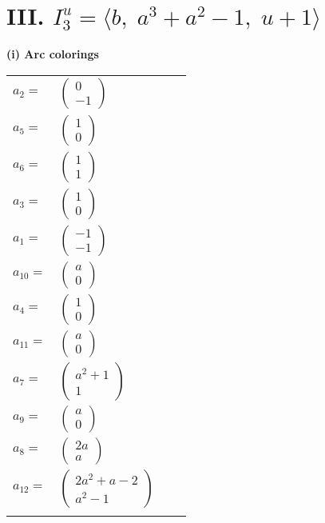 \documentclass[1p]{elsarticle_modified}
\theoremstyle{definition}
\begin{document}
\centering \section*{III. $I^u_{3}= \langle b,\;a^3+a^2-1,\;u+1 \rangle$}
\flushleft \textbf{(i) Arc colorings}\\
\begin{tabular}{m{7pt} m{180pt} m{7pt} m{180pt} }
\flushright $a_{2}=$&$\begin{pmatrix}0\\-1\end{pmatrix}$ \\
\flushright $a_{5}=$&$\begin{pmatrix}1\\0\end{pmatrix}$ \\
\flushright $a_{6}=$&$\begin{pmatrix}1\\1\end{pmatrix}$ \\
\flushright $a_{3}=$&$\begin{pmatrix}1\\0\end{pmatrix}$ \\
\flushright $a_{1}=$&$\begin{pmatrix}-1\\-1\end{pmatrix}$ \\
\flushright $a_{10}=$&$\begin{pmatrix}a\\0\end{pmatrix}$ \\
\flushright $a_{4}=$&$\begin{pmatrix}1\\0\end{pmatrix}$ \\
\flushright $a_{11}=$&$\begin{pmatrix}a\\0\end{pmatrix}$ \\
\flushright $a_{7}=$&$\begin{pmatrix}a^2+1\\1\end{pmatrix}$ \\
\flushright $a_{9}=$&$\begin{pmatrix}a\\0\end{pmatrix}$ \\
\flushright $a_{8}=$&$\begin{pmatrix}2 a\\a\end{pmatrix}$ \\
\flushright $a_{12}=$&$\begin{pmatrix}2 a^2+a-2\\a^2-1\end{pmatrix}$\\&\end{tabular}
\end{document}
